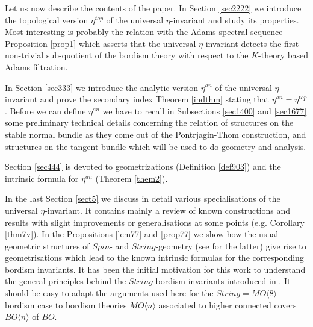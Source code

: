 \documentclass[12pt]{article}
\begin{document}
 

Let us now describe the contents of the paper.
In Section \ref{sec2222} we introduce the topological version $\eta^{top}$ of the universal $\eta$-invariant and study its properties. Most interesting is probably the relation with the Adams spectral sequence Proposition \ref{prop1} which asserts   that 
the universal $\eta$-invariant  detects the first non-trivial sub-quotient of the bordism theory
with respect to the $K$-theory based Adams filtration. 


In Section \ref{sec333} we introduce the analytic version $\eta^{an}$ of the universal $\eta$-invariant and prove the secondary index Theorem \ref{indthm} stating that $\eta^{an}=\eta^{top}$. Before we can define $\eta^{an}$ we have to recall in Subsections \ref{sec1400} and \ref{sec1677} some preliminary technical details   concerning the relation of structures on the stable normal bundle as they come out of the Pontrjagin-Thom construction, and structures on the tangent bundle which will be used to do geometry and analysis.

Section \ref{sec444} is devoted to geometrizations (Definition \ref{def903})  and the intrinsic formula for $\eta^{an}$ (Theorem \ref{them2}).

In the last Section \ref{sect5} we discuss in detail various specialisations of the universal $\eta$-invariant. It contains mainly a review of known constructions and results with slight improvements or generalisations at some points (e.g. Corollary \ref{thm7v}). In the Propositions 
 \ref{lem77} and \ref{prop77} we show how the usual geometric structures of $Spin$- and $String$-geometry (see \cite{2009arXiv0906.0117W} for the latter) give rise to geometrisations which lead to the known intrinsic formulas for the corresponding bordism invariants. It has  been the initial motivation for this work
to understand the general principles behind the $String$-bordism invariants introduced in \cite{2009arXiv0912.4875B}. It should be easy to adapt the  arguments used here for the $String=MO\langle8\rangle$-bordism case
  to bordism theories $MO\langle n\rangle$ associated to higher connected covers $BO\langle n\rangle$ of $BO$.
 






 
\end{document}
